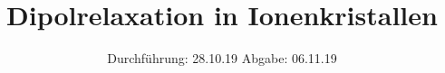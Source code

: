 
\setlength{\parindent}{0 pt}

\subject{V48}
\title{Dipolrelaxation in Ionenkristallen}
\date{%
  Durchführung: 28.10.19
  \hspace{3em}
  Abgabe: 06.11.19
}



\maketitle
\thispagestyle{empty}
\tableofcontents
\newpage






\printbibliography{}


